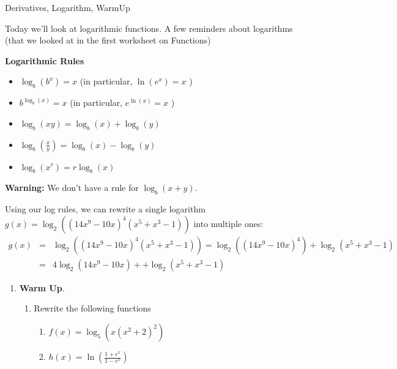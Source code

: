 

\begin{tagblock}{Derivatives, Logarithm, WarmUp}
\begin{question}
	


Today we'll look at logarithmic functions.  A few reminders about logarithms (that we looked at in the first worksheet on Functions)



\begin{tcolorbox}

\textbf{Logarithmic Rules} 
    \begin{itemize}
    \item     $\log_b(b^x)=x$  (in particular, $\ln(e^x) = x$ )
    \item $b^{\log_b(x)} =x$  (in particular, $e^{\ln(x)} = x$ )
    \item  $\log_b(xy) = \log_b(x) +  \log_b(y)$
     \item  $\log_b(\frac{x}{y}) = \log_b(x) -  \log_b(y)$
   \item $\log_b(x^r) = r \log_b(x)$
   \end{itemize}    

\end{tcolorbox}

\textbf{Warning:} We don't have a rule for $\log_b(x+y)$.  


\bigskip


Using our log rules, we can rewrite a single logarithm $g(x) = \log_2((14x^9-10x)^4(x^5+x^3-1))$ into multiple ones:
\begin{eqnarray*} g(x) &= &\log_2((14x^9-10x)^4(x^5+x^3-1)) =   \log_2((14x^9-10x)^4) + \log_2(x^5+x^3-1) \\
&=& 4 \log_2(14x^9-10x)+ + \log_2(x^5+x^3-1) \end{eqnarray*}

\begin{enumerate}
\item \textbf{Warm Up}.  
\begin{enumerate}
\item Rewrite the following functions 
\begin{enumerate}

\item $f(x) = \log_5 (x(x^2+2)^2)$

\vspace{1in}
\item $\displaystyle h(x) = \ln \left(\frac{1+e^x}{1-e^x} \right)$


\end{enumerate}
\end{enumerate}
\end{enumerate}
\end{question}
\end{tagblock}
